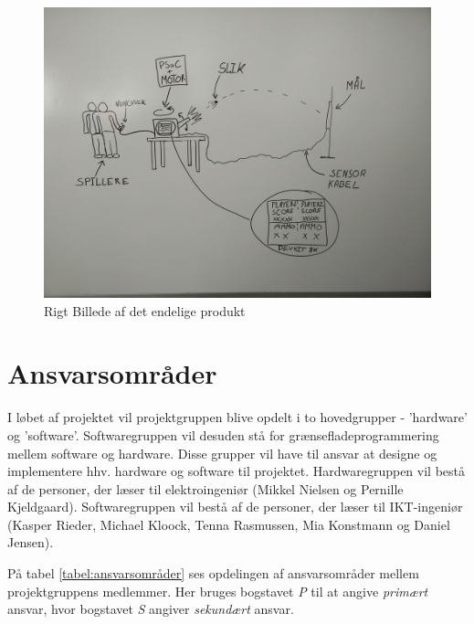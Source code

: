 \begin{figure}[H]
	\centering
	\includegraphics[width=\textwidth]{Projektformulering/images/rigtBillede}
	\caption{Rigt Billede af det endelige produkt}
	\label{ref:RigtBillede}
\end{figure}

\newpage
\section{Ansvarsområder}
I løbet af projektet vil projektgruppen blive opdelt i to hovedgrupper - 'hardware' og 'software'. Softwaregruppen vil desuden stå for grænsefladeprogrammering mellem software og hardware. Disse grupper vil have til ansvar at designe og implementere hhv. hardware og software til projektet. Hardwaregruppen vil bestå af de personer, der læser til elektroingeniør (Mikkel Nielsen og Pernille Kjeldgaard). Softwaregruppen vil bestå af de personer, der læser til IKT-ingeniør (Kasper Rieder, Michael Kloock, Tenna Rasmussen, Mia Konstmann og Daniel Jensen).

På tabel \ref{tabel:ansvarsområder} ses opdelingen af ansvarsområder mellem projektgruppens medlemmer. Her bruges bogstavet \textit{P} til at angive \textit{primært} ansvar, hvor bogstavet \textit{S} angiver \textit{sekundært} ansvar.

